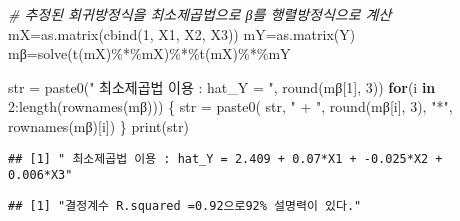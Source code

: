 \documentclass[
]{article}
\newenvironment{Shaded}{\begin{snugshade}}{\end{snugshade}}
\newcommand{\CommentTok}[1]{\textcolor[rgb]{0.56,0.35,0.01}{\textit{#1}}}
\newcommand{\ControlFlowTok}[1]{\textcolor[rgb]{0.13,0.29,0.53}{\textbf{#1}}}
\newcommand{\DecValTok}[1]{\textcolor[rgb]{0.00,0.00,0.81}{#1}}
\newcommand{\FunctionTok}[1]{\textcolor[rgb]{0.00,0.00,0.00}{#1}}
\newcommand{\NormalTok}[1]{#1}
\newcommand{\OtherTok}[1]{\textcolor[rgb]{0.56,0.35,0.01}{#1}}
\newcommand{\SpecialCharTok}[1]{\textcolor[rgb]{0.00,0.00,0.00}{#1}}
\newcommand{\StringTok}[1]{\textcolor[rgb]{0.31,0.60,0.02}{#1}}
\begin{document}
\begin{Shaded}
\begin{Highlighting}[]
\CommentTok{\# 추정된 회귀방정식을 최소제곱법으로 β를 행렬방정식으로 계산}
\NormalTok{mX}\OtherTok{=}\FunctionTok{as.matrix}\NormalTok{(}\FunctionTok{cbind}\NormalTok{(}\DecValTok{1}\NormalTok{, X1, X2, X3))}
\NormalTok{mY}\OtherTok{=}\FunctionTok{as.matrix}\NormalTok{(Y)}
\NormalTok{mβ}\OtherTok{=}\FunctionTok{solve}\NormalTok{(}\FunctionTok{t}\NormalTok{(mX)}\SpecialCharTok{\%*\%}\NormalTok{mX)}\SpecialCharTok{\%*\%}\FunctionTok{t}\NormalTok{(mX)}\SpecialCharTok{\%*\%}\NormalTok{mY}

\NormalTok{str }\OtherTok{=} \FunctionTok{paste0}\NormalTok{(}\StringTok{" 최소제곱법 이용 : hat\_Y = "}\NormalTok{, }\FunctionTok{round}\NormalTok{(mβ[}\DecValTok{1}\NormalTok{], }\DecValTok{3}\NormalTok{))}
\ControlFlowTok{for}\NormalTok{(i }\ControlFlowTok{in} \DecValTok{2}\SpecialCharTok{:}\FunctionTok{length}\NormalTok{(}\FunctionTok{rownames}\NormalTok{(mβ)))}
\NormalTok{\{}
\NormalTok{  str }\OtherTok{=} \FunctionTok{paste0}\NormalTok{( str, }\StringTok{" + "}\NormalTok{, }\FunctionTok{round}\NormalTok{(mβ[i], }\DecValTok{3}\NormalTok{), }\StringTok{"*"}\NormalTok{, }\FunctionTok{rownames}\NormalTok{(mβ)[i])}
\NormalTok{\}}
\FunctionTok{print}\NormalTok{(str)}
\end{Highlighting}
\end{Shaded}

\begin{verbatim}
## [1] " 최소제곱법 이용 : hat_Y = 2.409 + 0.07*X1 + -0.025*X2 + 0.006*X3"
\end{verbatim}

\begin{Shaded}
\end{Shaded}

\begin{verbatim}
## [1] "결정계수 R.squared =0.92으로92% 설명력이 있다."
\end{verbatim}
\end{document}
